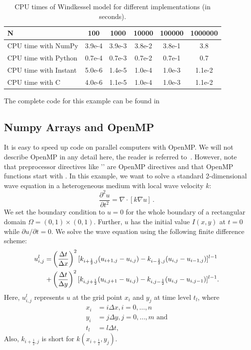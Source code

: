 \begin{table}[h]
\begin{center}
\begin{tabular}{|l|c|c|c|c|c|} \hline
N                     & 100     & 1000   & 10000  & 100000 & 1000000 \\ \hline 
CPU time with NumPy   & 3.9e-4  & 3.9e-3 & 3.8e-2 & 3.8e-1 & 3.8     \\ \hline 
CPU time with Python  & 0.7e-4  & 0.7e-3 & 0.7e-2 & 0.7e-1 & 0.7     \\ \hline 
CPU time with Instant & 5.0e-6  & 1.4e-5 & 1.0e-4 & 1.0e-3 & 1.1e-2  \\ \hline
CPU time with C       & 4.0e-6  & 1.1e-5 & 1.0e-4 & 1.0e-3 & 1.1e-2  \\ \hline 
\end{tabular}
\caption{CPU times of Windkessel model for different implementations (in seconds).}
\label{speed-up}
\end{center}
\end{table}
The complete code for this example can be found in 


\subsection{Numpy Arrays and OpenMP}
It is easy to speed up code on parallel computers with OpenMP. We will not
describe OpenMP in 
any detail here, the reader is referred to~\cite{OpenMP}. However, note
that preprocessor directives like '' are OpenMP directives and
that OpenMP functions start with .
In this example, we want
to solve a standard 2-dimensional wave equation in a heterogeneous medium with
local wave velocity $k$:
\begin{equation}
\frac{\partial^2u}{\partial t^2} = \nabla \cdot [k\nabla u]\, .
\end{equation}
We set the boundary condition to $u = 0$ for the whole boundary of a
rectangular domain $\Omega = (0,1) \times (0,1)$. Further, $u$ has the initial
value $I(x,y)$ at $t = 0$ while $\partial u/ \partial t = 0$.
We solve the wave equation using the following finite difference scheme:
\begin{align}
u_{i,j}^l = 
&\left(\frac{\Delta t}{\Delta x}\right)^2
[k_{i+\frac{1}{2},j}(u_{i+1,j} - u_{i,j}) - k_{i-\frac{1}{2},j}(u_{i,j} - u_{i-1,j})]^{l-1}\notag\\
+&\left(\frac{\Delta t}{\Delta y}\right)^2
[k_{i,j+\frac{1}{2}}(u_{i,j+1} - u_{i,j}) - k_{i,j-\frac{1}{2}}(u_{i,j} - u_{i,j-1})]^{l-1}.
\end{align}\label{u}
Here, $u_{i,j}^l$ represents $u$ at the grid point $x_i$ and $y_j$ at
time level $t_l$, where
\begin{align*}
x_i &= i\Delta x, i = 0, \ldots, n\\
y_i &= j\Delta y, j = 0, \ldots, m\textrm{ and}\\
t_l &= l\Delta t,
\end{align*}
Also, $k_{i+\frac{1}{2},j}$ is short for $k(x_{i+\frac{1}{2}},y_j)$.

